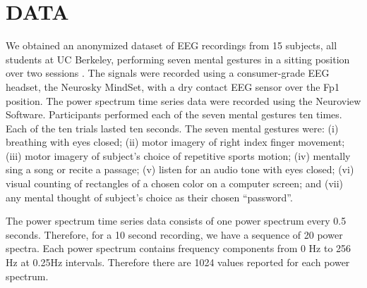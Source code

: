 \section{\uppercase{Data}}
\label{sec:data}


\noindent We obtained an anonymized dataset of EEG recordings from 15 subjects, all students at UC Berkeley, performing seven mental gestures in a sitting position over two sessions \cite{adams_i_2013}. The signals were recorded using a consumer-grade EEG headset, the Neurosky MindSet, with a dry contact EEG sensor over the Fp1 position. The power spectrum time series data were recorded using the Neuroview Software.
Participants performed each of the seven mental gestures ten times. Each of the ten trials lasted ten seconds. The seven mental gestures were: (i) breathing with eyes closed; (ii) motor imagery of right index finger movement; (iii) motor imagery of subject's choice of repetitive sports motion; (iv) mentally sing a song or recite a passage; (v) listen for an audio tone with eyes closed; (vi) visual counting of rectangles of a chosen color on a computer screen; and (vii) any mental thought of subject's choice as their chosen ``password''.


The power spectrum time series data consists of one power spectrum every 0.5 seconds. Therefore, for a 10 second recording, we have a sequence of 20 power spectra. Each power spectrum contains frequency components from 0 Hz to 256 Hz at 0.25Hz intervals. Therefore there are 1024 values reported for each power spectrum.


